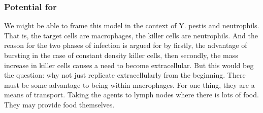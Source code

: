 \subsubsection{Potential for \yp}

We might be able to frame this model in the context of Y. pestis and neutrophils. That is, the target cells are macrophages, the killer cells are neutrophils. And the reason for the two phases of infection is argued for by firstly, the advantage of bursting in the case of constant density killer cells, then secondly, the mass increase in killer cells causes a need to become extracellular. But this would beg the question: why not just replicate extracellularly from the beginning. There must be some advantage to being within macrophages. For one thing, they are a means of transport. Taking the agents to lymph nodes where there is lots of food. They may provide food themselves.
